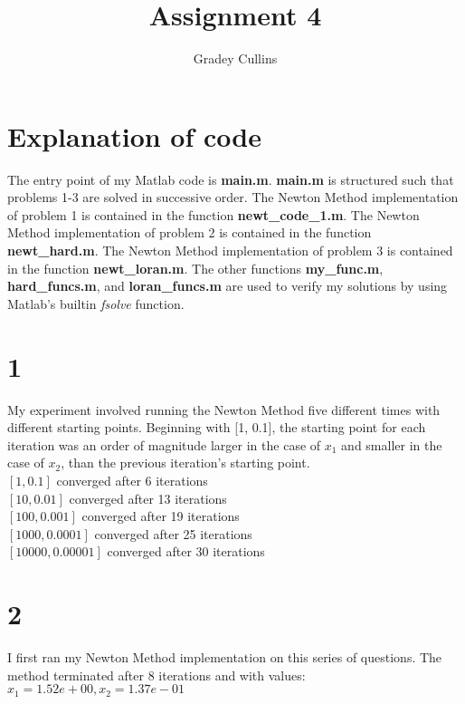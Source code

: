 \documentclass[10pt,a4paper]{article}
\author{Gradey Cullins}
\title{Assignment 4}
\begin{document}
\maketitle

\section*{Explanation of code}
The entry point of my Matlab code is \textbf{main.m}. \textbf{main.m} is structured such that problems 1-3 are solved in successive order. The Newton Method implementation of problem 1 is contained in the function \textbf{newt\_code\_1.m}. The Newton Method implementation of problem 2 is contained in the function \textbf{newt\_hard.m}. The Newton Method implementation of problem 3 is contained in the function \textbf{newt\_loran.m}. The other functions \textbf{my\_func.m}, \textbf{hard\_funcs.m}, and \textbf{loran\_funcs.m} are used to verify my solutions by using Matlab's builtin \textit{fsolve} function.

\section*{1}

My experiment involved running the Newton Method five different times with different starting points. Beginning with [1, 0.1], the starting point for each iteration was an order of magnitude larger in the case of $x_1$ and smaller in the case of $x_2$, than the previous iteration's starting point. \\

\noindent
$[1, 0.1]$ converged after 6 iterations \\
$[10, 0.01]$ converged after 13 iterations \\
$[100, 0.001]$ converged after 19 iterations \\
$[1000, 0.0001]$ converged after 25 iterations \\
$[10000, 0.00001]$ converged after 30 iterations \\

\section*{2}

I first ran my Newton Method implementation on this series of questions. The method terminated after 8 iterations and with values: \\

\noindent
$ x_1 = 1.52e+00, x_2 = 1.37e-01 $ \\
\end{document}
